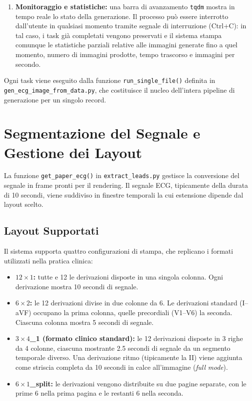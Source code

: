 \begin{enumerate}
    \item \textbf{Monitoraggio e statistiche:} una barra di avanzamento \texttt{tqdm} mostra in tempo reale lo stato della generazione. Il processo può essere interrotto dall'utente in qualsiasi momento tramite segnale di interruzione ({\ttfamily Ctrl+C}): in tal caso, i task già completati vengono preservati e il sistema stampa comunque le statistiche parziali relative alle immagini generate fino a quel momento, numero di immagini prodotte, tempo trascorso e immagini per secondo.
\end{enumerate}

Ogni task viene eseguito dalla funzione \texttt{run\_single\_file()} definita in \texttt{gen\_ecg\_image\_from\_data.py}, che costituisce il nucleo dell'intera pipeline di generazione per un singolo record.

\section{Segmentazione del Segnale e Gestione dei Layout}

La funzione \texttt{get\_paper\_ecg()} in \texttt{extract\_leads.py} gestisce la conversione del segnale in frame pronti per il rendering. Il segnale ECG, tipicamente della durata di 10 secondi, viene suddiviso in finestre temporali la cui estensione dipende dal layout scelto.

\subsection{Layout Supportati}

Il sistema supporta quattro configurazioni di stampa, che replicano i formati utilizzati nella pratica clinica:

\begin{itemize}
    \item \textbf{$12\times1$:} tutte e 12 le derivazioni disposte in una singola colonna. Ogni derivazione mostra 10 secondi di segnale.
    \item \textbf{$6\times2$:} le 12 derivazioni divise in due colonne da 6. Le derivazioni standard (I--aVF) occupano la prima colonna, quelle precordiali (V1--V6) la seconda. Ciascuna colonna mostra 5 secondi di segnale.
    \item \textbf{$3\times4$\_1 (formato clinico standard):} le 12 derivazioni disposte in 3 righe da 4 colonne, ciascuna mostrante 2.5 secondi di segnale da un segmento temporale diverso. Una derivazione ritmo (tipicamente la II) viene aggiunta come striscia completa da 10 secondi in calce all'immagine (\textit{full mode}).
    \item \textbf{$6\times1$\_split:} le derivazioni vengono distribuite su due pagine separate, con le prime 6 nella prima pagina e le restanti 6 nella seconda.
\end{itemize}

